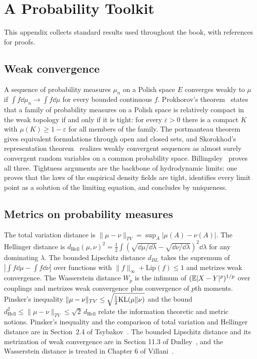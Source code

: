 \chapter{A Probability Toolkit}
\label{app:toolkit}

This appendix collects standard results used throughout the book, with references for proofs.

\section{Weak convergence}

A sequence of probability measures $\mu_n$ on a Polish space $E$ converges weakly to $\mu$ if $\int f\dd\mu_n\to\int f\dd\mu$ for every bounded continuous $f$. Prokhorov's theorem~\cite{prokhorov1956} states that a family of probability measures on a Polish space is relatively compact in the weak topology if and only if it is tight: for every $\varepsilon>0$ there is a compact $K$ with $\mu(K)\geq1-\varepsilon$ for all members of the family. The portmanteau theorem gives equivalent formulations through open and closed sets, and Skorokhod's representation theorem~\cite{skorokhod1956} realizes weakly convergent sequences as almost surely convergent random variables on a common probability space. Billingsley~\cite{billingsley1999} proves all three. Tightness arguments are the backbone of hydrodynamic limits: one proves that the laws of the empirical density fields are tight, identifies every limit point as a solution of the limiting equation, and concludes by uniqueness.

\section{Metrics on probability measures}

The total variation distance is $\|\mu-\nu\|_{TV} = \sup_A|\mu(A)-\nu(A)|$. The Hellinger distance is $d_{\mathrm{Hell}}(\mu,\nu)^2 = \frac12\int(\sqrt{\dd\mu/\dd\lambda}-\sqrt{\dd\nu/\dd\lambda})^2\dd\lambda$ for any dominating $\lambda$. The bounded Lipschitz distance $d_{BL}$ takes the supremum of $|\int f\dd\mu-\int f\dd\nu|$ over functions with $\|f\|_\infty+\mathrm{Lip}(f)\leq1$ and metrizes weak convergence. The Wasserstein distance $W_p$ is the infimum of $(\mathbb{E}|X-Y|^p)^{1/p}$ over couplings and metrizes weak convergence plus convergence of $p$th moments. Pinsker's inequality $\|\mu-\nu\|_{TV}\leq\sqrt{\frac12\mathrm{KL}(\mu\|\nu)}$ and the bound $d_{\mathrm{Hell}}^2\leq\|\mu-\nu\|_{TV}\leq\sqrt2\,d_{\mathrm{Hell}}$ relate the information theoretic and metric notions. Pinsker's inequality and the comparison of total variation and Hellinger distance are in Section~2.4 of Tsybakov~\cite{tsybakov2009}. The bounded Lipschitz distance and its metrization of weak convergence are in Section 11.3 of Dudley~\cite{dudley2002}, and the Wasserstein distance is treated in Chapter 6 of Villani~\cite{villani2009}.


